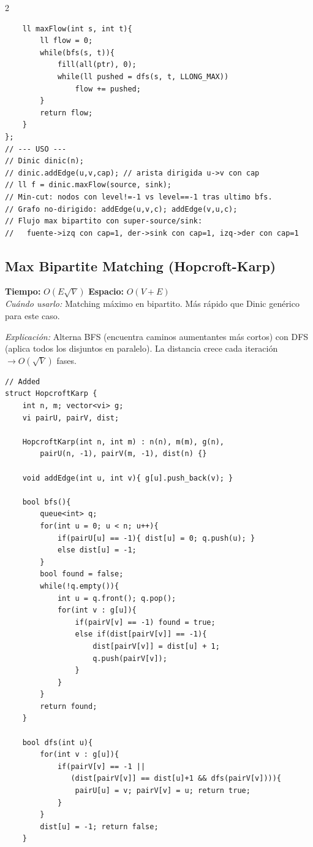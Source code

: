 \documentclass[10pt,a4paper]{article}
\begin{document}
\begin{multicols}{2}
\begin{lstlisting}
    ll maxFlow(int s, int t){
        ll flow = 0;
        while(bfs(s, t)){
            fill(all(ptr), 0);
            while(ll pushed = dfs(s, t, LLONG_MAX))
                flow += pushed;
        }
        return flow;
    }
};
// --- USO ---
// Dinic dinic(n);
// dinic.addEdge(u,v,cap); // arista dirigida u->v con cap
// ll f = dinic.maxFlow(source, sink);
// Min-cut: nodos con level!=-1 vs level==-1 tras ultimo bfs.
// Grafo no-dirigido: addEdge(u,v,c); addEdge(v,u,c);
// Flujo max bipartito con super-source/sink:
//   fuente->izq con cap=1, der->sink con cap=1, izq->der con cap=1
\end{lstlisting}

\subsection{Max Bipartite Matching (Hopcroft-Karp)}
\textbf{Tiempo:} $O(E\sqrt{V})$ \quad \textbf{Espacio:} $O(V + E)$\\
\textit{Cu\'ando usarlo:} Matching m\'aximo en bipartito. M\'as r\'apido que Dinic gen\'erico para este caso.

\textit{Explicaci\'on:} Alterna BFS (encuentra caminos aumentantes m\'as cortos) con DFS (aplica todos los disjuntos en paralelo). La distancia crece cada iteraci\'on $\to O(\sqrt{V})$ fases.

\begin{lstlisting}
// Added
struct HopcroftKarp {
    int n, m; vector<vi> g;
    vi pairU, pairV, dist;

    HopcroftKarp(int n, int m) : n(n), m(m), g(n),
        pairU(n, -1), pairV(m, -1), dist(n) {}

    void addEdge(int u, int v){ g[u].push_back(v); }

    bool bfs(){
        queue<int> q;
        for(int u = 0; u < n; u++){
            if(pairU[u] == -1){ dist[u] = 0; q.push(u); }
            else dist[u] = -1;
        }
        bool found = false;
        while(!q.empty()){
            int u = q.front(); q.pop();
            for(int v : g[u]){
                if(pairV[v] == -1) found = true;
                else if(dist[pairV[v]] == -1){
                    dist[pairV[v]] = dist[u] + 1;
                    q.push(pairV[v]);
                }
            }
        }
        return found;
    }

    bool dfs(int u){
        for(int v : g[u]){
            if(pairV[v] == -1 || 
               (dist[pairV[v]] == dist[u]+1 && dfs(pairV[v]))){
                pairU[u] = v; pairV[v] = u; return true;
            }
        }
        dist[u] = -1; return false;
    }


\end{lstlisting}
\end{multicols}
\end{document}
